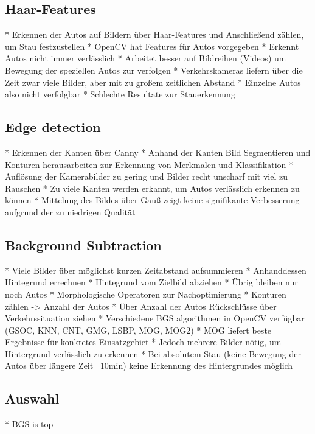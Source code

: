 \subsection{Haar-Features}
* Erkennen der Autos auf Bildern über Haar-Features und Anschließend zählen, um Stau festzustellen\newline
* OpenCV hat Features für Autos vorgegeben\newline
* Erkennt Autos nicht immer verlässlich\newline
* Arbeitet besser auf Bildreihen (Videos) um Bewegung der speziellen Autos zur verfolgen\newline
* Verkehrskameras liefern über die Zeit zwar viele Bilder, aber mit zu großem zeitlichen Abstand\newline
* Einzelne Autos also nicht verfolgbar\newline
* Schlechte Resultate zur Stauerkennung\newline

\subsection{Edge detection}
* Erkennen der Kanten über Canny\newline
* Anhand der Kanten Bild Segmentieren und Konturen herausarbeiten zur Erkennung von Merkmalen und Klassifikation\newline
* Auflösung der Kamerabilder zu gering und Bilder recht unscharf mit viel zu Rauschen\newline
* Zu viele Kanten werden erkannt, um Autos verlässlich erkennen zu können\newline
* Mittelung des Bildes über Gauß zeigt keine signifikante Verbesserung aufgrund der zu niedrigen Qualität\newline
	
\subsection{Background Subtraction}
* Viele Bilder über möglichst kurzen Zeitabstand aufsummieren\newline
* Anhanddessen Hintegrund errechnen\newline
* Hintegrund vom Zielbild abziehen\newline
* Übrig bleiben nur noch Autos\newline
* Morphologische Operatoren zur Nachoptimierung\newline
* Konturen zählen -> Anzahl der Autos\newline
* Über Anzahl der Autos Rückschlüsse über Verkehrssituation ziehen\newline
* Verschiedene BGS algorithmen in OpenCV verfügbar (GSOC, KNN, CNT, GMG, LSBP, MOG, MOG2)\newline
* MOG liefert beste Ergebnisse für konkretes Einsatzgebiet\newline
* Jedoch mehrere Bilder nötig, um Hintergrund verlässlich zu erkennen\newline
* Bei absolutem Stau (keine Bewegung der Autos über längere Zeit ~10min) keine Erkennung des Hintergrundes möglich\newline

\subsection{Auswahl}
* BGS is top
